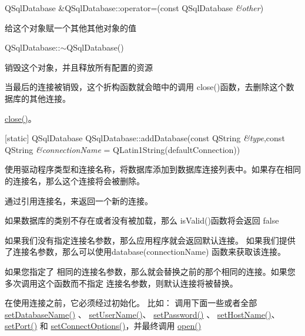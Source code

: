 QSqlDatabase \&QSqlDatabase::operator=(const QSqlDatabase \emph{\&other})

给这个对象赋一个其他其他对象的值

QSqlDatabase::$\sim$QSqlDatabase()

销毁这个对象，并且释放所有配置的资源 

\begin{notice}
当最后的连接被销毁，这个折构函数就会暗中的调用 close()函数，去删除这个数据库的其他连接。
\end{notice}

\begin{seeAlso}
\href{https://github.com/QtDocumentCN/QtDocumentCN/blob/master/Src/S/QSqlDatabase/QSqlDatabase.md#void-qsqldatabaseclose}{close()}。
\end{seeAlso}



[static] QSqlDatabase QSqlDatabase::addDatabase(const QString \emph{\&type},const QString \emph{\&connectionName} = QLatin1String(defaultConnection))

使用驱动程序类型和连接名称，将数据库添加到数据库连接列表中。如果存在相同的连接名，那么这个连接将会被删除。

通过引用连接名，来返回一个新的连接。

如果数据库的类别不存在或者没有被加载，那么 isValid()函数将会返回 false

如果我们没有指定连接名参数，那么应用程序就会返回默认连接。 如果我们提供了连接名参数，那么可以使用database(connectionName) 函数来获取该连接。

\begin{warning}
如果您指定了 相同的连接名参数，那么就会替换之前的那个相同的连接。如果您多次调用这个函数而不指定 连接名参数，则默认连接将被替换。
\end{warning}


在使用连接之前，它必须经过初始化。
比如： 调用下面一些或者全部 \href{https://github.com/QtDocumentCN/QtDocumentCN/blob/master/Src/S/QSqlDatabase/QSqlDatabase.md#void-qsqldatabasesetdatabasenameconst-qstring-name}{setDatabaseName()} 、 \href{https://github.com/QtDocumentCN/QtDocumentCN/blob/master/Src/S/QSqlDatabase/QSqlDatabase.md#void-qsqldatabasesetusernameconst-qstring-name}{setUserName()}、 \href{https://github.com/QtDocumentCN/QtDocumentCN/blob/master/Src/S/QSqlDatabase/QSqlDatabase.md#void-qsqldatabasesetpasswordconst-qstring-password}{setPassword()} 、 \href{https://github.com/QtDocumentCN/QtDocumentCN/blob/master/Src/S/QSqlDatabase/QSqlDatabase.md#void-qsqldatabasesethostnameconst-qstring-host}{setHostName()}、 \href{https://github.com/QtDocumentCN/QtDocumentCN/blob/master/Src/S/QSqlDatabase/QSqlDatabase.md#void-qsqldatabasesetportint-port}{setPort()} 和 \href{https://github.com/QtDocumentCN/QtDocumentCN/blob/master/Src/S/QSqlDatabase/QSqlDatabase.md#void-qsqldatabasesetconnectoptionsconst-qstring-options--qstring}{setConnectOptions()}，并最终调用 \href{https://github.com/QtDocumentCN/QtDocumentCN/blob/master/Src/S/QSqlDatabase/QSqlDatabase.md#bool-qsqldatabaseopen}{open()}



